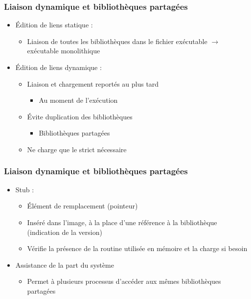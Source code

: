 \begin{frame}
\frametitle{Liaison dynamique et bibliothèques partagées}
\begin{itemize}
\item Édition de liens statique : 
\begin{itemize}
\item Liaison de toutes les bibliothèques dans le fichier exécutable $\rightarrow$ exécutable monolithique
\end{itemize}
\item Édition de liens dynamique :
\begin{itemize}
\item Liaison et chargement reportés au plus tard
\begin{itemize}
\item Au moment de l'exécution
\end{itemize}
\item Évite duplication des bibliothèques
\begin{itemize}
\item Bibliothèques partagées
\end{itemize}
\item Ne charge que le strict nécessaire
\end{itemize}
\end{itemize}
\end{frame}


\begin{frame}
\frametitle{Liaison dynamique et bibliothèques partagées}
\begin{itemize}
\item Stub :
\begin{itemize}
\item Élément de remplacement (pointeur)
\item Inséré dans l'image, à la place d'une référence à la bibliothèque (indication de la version)
\item Vérifie la présence de la routine utilisée en mémoire et la charge si besoin
\end{itemize}
\item Assistance de la part du système
\begin{itemize}
\item Permet à plusieurs processus d'accéder aux mêmes bibliothèques partagées
\end{itemize}
\end{itemize}
\end{frame}


